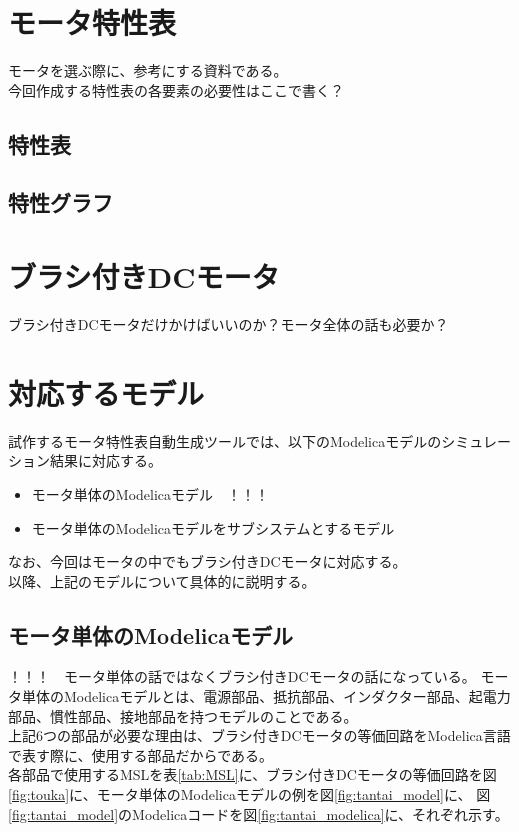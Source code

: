 \section{モータ特性表}\label{mortoku}
モータを選ぶ際に、参考にする資料である。\\
今回作成する特性表の各要素の必要性はここで書く？

\subsection{特性表}\label{tokuhyou}


\subsection{特性グラフ}\label{tokugura}


\section{ブラシ付きDCモータ}\label{}
ブラシ付きDCモータだけかけばいいのか？モータ全体の話も必要か？

\section{対応するモデル}\label{taioumodel}
試作するモータ特性表自動生成ツールでは、以下のModelicaモデルのシミュレーション結果に対応する。
\begin{itemize}
	\item モータ単体のModelicaモデル　！！！
	\item モータ単体のModelicaモデルをサブシステムとするモデル
\end{itemize}
なお、今回はモータの中でもブラシ付きDCモータに対応する。\\
以降、上記のモデルについて具体的に説明する。

\subsection{モータ単体のModelicaモデル}\label{sec:sub1}
！！！　モータ単体の話ではなくブラシ付きDCモータの話になっている。
モータ単体のModelicaモデルとは、電源部品、抵抗部品、インダクター部品、起電力部品、慣性部品、接地部品を持つモデルのことである。\\
上記6つの部品が必要な理由は、ブラシ付きDCモータの等価回路\cite{等価回路}をModelica言語で表す際に、使用する部品\cite{modelicaシステム本}だからである。\\
各部品で使用するMSLを表\ref{tab:MSL}に、ブラシ付きDCモータの等価回路を図\ref{fig:touka}に、モータ単体のModelicaモデルの例を図\ref{fig:tantai_model}に、
図\ref{fig:tantai_model}のModelicaコードを図\ref{fig:tantai_modelica}に、それぞれ示す。


